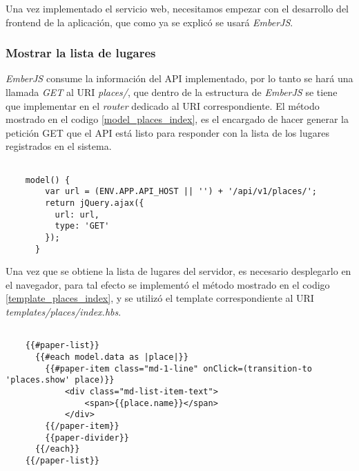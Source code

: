 Una vez implementado el servicio web, necesitamos empezar con el desarrollo del frontend de la aplicación, que como ya se explicó se usará \emph{EmberJS}. \\


\subsubsection{Mostrar la lista de lugares}


\emph{EmberJS} consume la información del API implementado, por lo tanto se hará una llamada \emph{GET} al URI \emph{places/}, que dentro de la estructura de \emph{EmberJS} se tiene que implementar en el \emph{router} dedicado al URI correspondiente. El método mostrado en el codigo \ref{model_places_index}, es el encargado de hacer generar la petición GET que el API está listo para responder con la lista de los lugares registrados en el sistema. \\

\begin{center}
  \begin{lstlisting}[label=model_places_index,caption=Método para obtener la lista de lugares del API]

    model() {
        var url = (ENV.APP.API_HOST || '') + '/api/v1/places/';
        return jQuery.ajax({
          url: url,
          type: 'GET'
        });
      }

  \end{lstlisting}
\end{center}

Una vez que se obtiene la lista de lugares del servidor, es necesario desplegarlo en el navegador, para tal efecto se implement\'o el método mostrado en el codigo \ref{template_places_index}, y se utilizó el template correspondiente al URI \emph{templates/places/index.hbs}.

\begin{center}
  \begin{lstlisting}[label=template_places_index,caption=Template de la lista de lugares]

    {{#paper-list}}
      {{#each model.data as |place|}}
        {{#paper-item class="md-1-line" onClick=(transition-to 'places.show' place)}}
            <div class="md-list-item-text">
                <span>{{place.name}}</span>
            </div>
        {{/paper-item}}
        {{paper-divider}}
      {{/each}}
    {{/paper-list}}

  \end{lstlisting}
\end{center}

